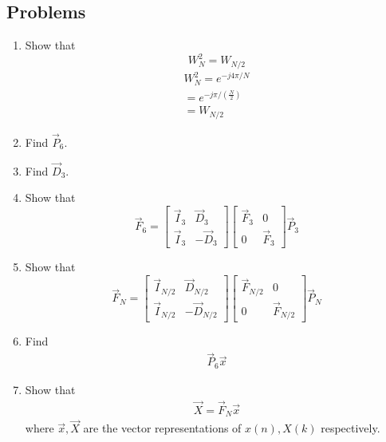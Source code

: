 \documentclass[journal,12pt,twocolumn]{IEEEtran}
\renewcommand\thesection{\arabic{section}}
\begin{document}
 \subsection{Problems}
\begin{enumerate}[label=\arabic*.,ref=\thesection.\theenumi]
\item Show that 
\begin{equation}
    W_{N}^{2}=W_{N/2}
\end{equation}
\solution 
\begin{align}
W_{N}^{2}=e^{-j4\pi/N}\\
=e^{-j\pi/ (\frac{N}{2})}\\
=W_{N/2}
\end{align}
    \item Find $\vec{P}_6$.
    \item Find $\vec{D}_3$.
    \item Show that 
\begin{equation}
	\vec{F}_{6}=
\begin{bmatrix}
	\vec{I}_{3} & \vec{D}_{3} \\
\vec{I}_{3} & -\vec{D}_{3}
\end{bmatrix}
\begin{bmatrix}
\vec{F}_{3} & 0 \\
0 & \vec{F}_{3}
\end{bmatrix}
\vec{P}_{3}
\end{equation}
\item Show that 
\begin{equation}
\vec{F}_{N}=
\begin{bmatrix}
\vec{I}_{N/2} & \vec{D}_{N/2} \\
\vec{I}_{N/2} & -\vec{D}_{N/2}
\end{bmatrix}
\begin{bmatrix}
\vec{F}_{N/2} & 0 \\
0 & \vec{F}_{N/2}
\end{bmatrix}
\vec{P}_{N}
\end{equation}
\item Find 
    \begin{align}
	     \vec{P}_6 \vec{x}
    \end{align}
\item Show that 
    \begin{align}
	    \vec{X} = \vec{F}_N \vec{x}
	    \label{eq:dft-mat-def}
    \end{align}
		where $\vec{x}, \vec{X}$ are the vector representations of $x(n), X(k)$ respectively.

\end{enumerate}
\end{document}

